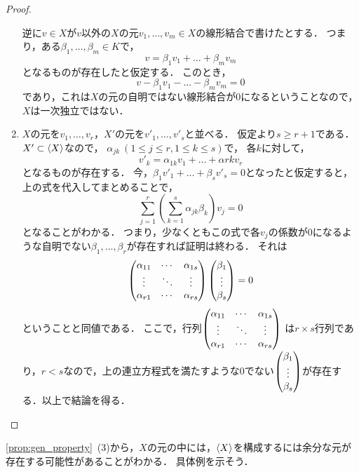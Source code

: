 \begin{proof}
\begin{enumerate}
    逆に$v \in X$が$v$以外の$X$の元$v_1,\dots,v_m \in X$の線形結合で書けたとする．
    つまり，ある$\beta_1,\dots,\beta_m \in K$で，
    \[
      v = \beta_1 v_1 + \dots + \beta_m v_m
    \]
    となるものが存在したと仮定する．
    このとき，
    \[
      v - \beta_1 v_1 - \dots - \beta_m v_m = 0  
    \]
    であり，これは$X$の元の自明ではない線形結合が0になるということなので，$X$は一次独立ではない．
    \item $X$の元を$v_1,\dots,v_r$，$X'$の元を$v'_1,\dots,v'_s$と並べる．
    仮定より$s \ge r+1$である．
    $X' \subset \left\langle X \right\rangle$なので，
    $\alpha_{jk}\ (1 \le j \le r, 1 \le k \le s)$で，
    各$k$に対して，
    \[
      v'_k = \alpha_{1k} v_1 + \dots + \alpha{rk} v_r  
    \]
    となるものが存在する．
    今，$\beta_1 v'_1 + \dots + \beta_s v'_s = 0$となったと仮定すると，
    上の式を代入してまとめることで，
    \[
      \sum_{j=1}^r \left(\sum_{k=1}^s \alpha_{jk} \beta_k\right) v_j = 0
    \]
    となることがわかる．
    つまり，少なくともこの式で各$v_j$の係数が0になるような自明でない$\beta_1,\dots,\beta_r$が存在すれば証明は終わる．
    それは
    \[
      \pmt{
        \alpha_{11} & \cdots & \alpha_{1s} \\%
        \vdots & \ddots & \vdots \\%
        \alpha_{r1} & \cdots & \alpha_{rs}}%
      \pmt{
        \beta_1 \\ \vdots \\ \beta_s
      } = 0
    \]
    ということと同値である．
    ここで，行列$\pmt{
        \alpha_{11} & \cdots & \alpha_{1s} \\%
        \vdots & \ddots & \vdots \\%
        \alpha_{r1} & \cdots & \alpha_{rs}}$
    は$r \times s$行列であり，$r < s$なので，上の連立方程式を満たすような0でない$\begin{pmatrix}  \beta_1 \\ \vdots \\ \beta_s  \end{pmatrix}$が存在する．以上で結論を得る．
  \end{enumerate}
\end{proof}
\cref{prop:gen_property}~(3)から，$X$の元の中には，$\left\langle X \right\rangle$を構成するには余分な元が存在する可能性があることがわかる．
具体例を示そう．
